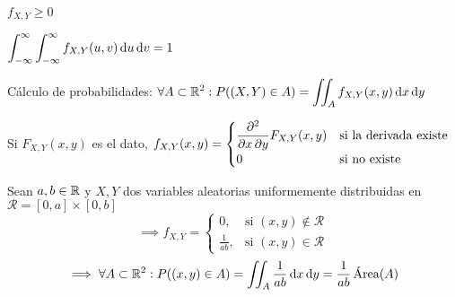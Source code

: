 \begin{obs}
	\begin{itemize*}[itemjoin=\hspace{1cm}]
		\item $f_{X, Y} \geq 0$
		\item $\ds \int_{-\infty}^{\infty} \int_{-\infty}^{\infty} f_{X, Y}(u, v) \odif{u} \odif{v} = 1$
	\end{itemize*}
\end{obs}

Cálculo de probabilidades: $\ds \forall A \subset \R^2 : P((X, Y)\in A) = \iint_{A} f_{X, Y}(x, y) \odif{x} \odif{y}$

Si $F_{X, Y} (x, y)$ es el dato, $\displaystyle f_{X, Y}(x, y) = \begin{cases} \displaystyle \pdv{}{x, y} F_{X, Y}(x, y) &\text{si la derivada existe} \\ 0 &\text{si no existe}\end{cases}$

\begin{ejem}
	Sean $a, b \in \mathbb{R}$ y $X, Y$ dos variables aleatorias uniformemente distribuidas en $\mathcal{R} = [0, a] \times [0, b]$
	\[\implies f_{X, Y} = \begin{cases}
			0,            & \text{si } (x, y) \notin \mathcal{R} \\
			\frac{1}{ab}, & \text{si } (x, y) \in \mathcal{R}
		\end{cases}\]
	\[\implies \forall A \subset \R^2 : P((x, y) \in A) = \iint_{A} \frac{1}{ab} \odif{x} \odif{y} = \frac{1}{ab} \operatorname{\tex{Área}}(A)\]
\end{ejem}


